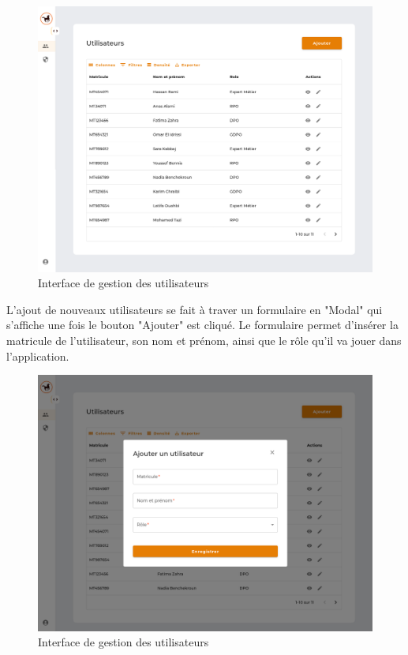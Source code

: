 \begin{figure}[H]
    \centering
    \includegraphics[width=\textwidth]{images/guis/utilisateurs.png}
    \caption{Interface de gestion des utilisateurs}
\end{figure}

\vspace{.3cm}

\noindent L'ajout de nouveaux utilisateurs se fait à traver un formulaire en "Modal" qui s'affiche une fois le bouton "Ajouter" est cliqué. Le formulaire permet d'insérer la matricule de l'utilisateur, son nom et prénom, ainsi que le rôle qu'il va jouer dans l'application.

\begin{figure}[H]
    \centering
    \includegraphics[width=.9\textwidth]{images/guis/utilisateurs/form/form-empty.png}
    \caption{Interface de gestion des utilisateurs}
\end{figure}

